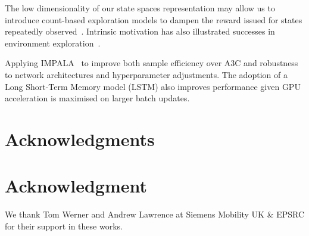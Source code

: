 \documentclass[conference,compsoc]{IEEEtran}
\begin{document}
The low dimensionality of our state spaces representation may allow us to introduce count-based exploration models to dampen the reward issued for states repeatedly observed~\cite{ostrovski2017countbased}. Intrinsic motivation has also illustrated successes in environment exploration~\cite{houthooft2017vime}.

Applying IMPALA~\cite{espeholt2018impala} to improve both sample efficiency over A3C and robustness to network architectures and hyperparameter adjustments. The adoption of a Long Short-Term Memory model (LSTM) also improves performance given GPU acceleration is maximised on larger batch updates.







\ifCLASSOPTIONcompsoc
  \section*{Acknowledgments}
\else
  \section*{Acknowledgment}
\fi
We thank Tom Werner and Andrew Lawrence at Siemens Mobility UK \& EPSRC for their support in these works.




%




\end{document}
